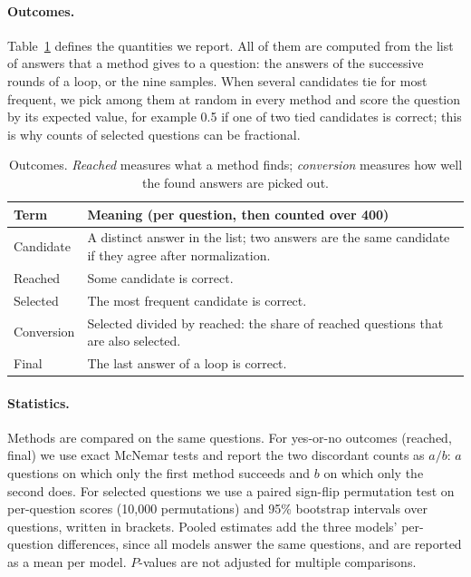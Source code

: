 \documentclass[11pt]{article}
\begin{document}
\paragraph{Outcomes.}
Table~\ref{tab:terms} defines the quantities we report.
All of them are computed from the list of answers that a method gives to a question: the answers of the successive rounds of a loop, or the nine samples.
When several candidates tie for most frequent, we pick among them at random in every method and score the question by its expected value, for example 0.5 if one of two tied candidates is correct; this is why counts of selected questions can be fractional.

\begin{table}[t]
\centering
\small
\setlength{\tabcolsep}{3pt}
\begin{tabular}{@{}lp{5.6cm}@{}}
\toprule
Term & Meaning (per question, then counted over 400) \\
\midrule
Candidate & A distinct answer in the list; two answers are the same candidate if they agree after normalization. \\
Reached & Some candidate is correct. \\
Selected & The most frequent candidate is correct. \\
Conversion & Selected divided by reached: the share of reached questions that are also selected. \\
Final & The last answer of a loop is correct. \\
\bottomrule
\end{tabular}
\caption{Outcomes. \emph{Reached} measures what a method finds; \emph{conversion} measures how well the found answers are picked out.}
\label{tab:terms}
\end{table}

\paragraph{Statistics.}
Methods are compared on the same questions.
For yes-or-no outcomes (reached, final) we use exact McNemar tests and report the two discordant counts as $a/b$: $a$ questions on which only the first method succeeds and $b$ on which only the second does.
For selected questions we use a paired sign-flip permutation test on per-question scores (10{,}000 permutations) and 95\% bootstrap intervals over questions, written in brackets.
Pooled estimates add the three models' per-question differences, since all models answer the same questions, and are reported as a mean per model.
$P$-values are not adjusted for multiple comparisons.
\end{document}
